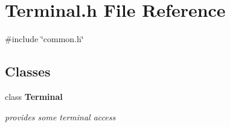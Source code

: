 \section{Terminal.\+h File Reference}
\label{Terminal_8h}
{\ttfamily \#include \char`\"{}common.\+h\char`\"{}}\newline
\subsection*{Classes}
\begin{DoxyCompactItemize}
\item 
class \textbf{ Terminal}
\begin{DoxyCompactList}\small\item\em provides some terminal access \end{DoxyCompactList}\end{DoxyCompactItemize}
